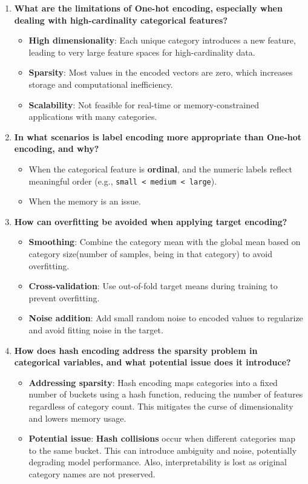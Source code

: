 \documentclass[a4paper,12pt]{article}
\begin{document}
\begin{enumerate}[label=(\alph*)]
\item \textbf{What are the limitations of One-hot encoding, especially when dealing with high-cardinality categorical features?}

\begin{itemize}
    \item \textbf{High dimensionality}: Each unique category introduces a new feature, leading to very large feature spaces for high-cardinality data.
    \item \textbf{Sparsity}: Most values in the encoded vectors are zero, which increases storage and computational inefficiency.
    \item \textbf{Scalability}: Not feasible for real-time or memory-constrained applications with many categories.
\end{itemize}

\item \textbf{In what scenarios is label encoding more appropriate than One-hot encoding, and why?}

\begin{itemize}
    \item When the categorical feature is \textbf{ordinal}, and the numeric labels reflect meaningful order (e.g., \texttt{small < medium < large}).
    \item When the memory is an issue.
\end{itemize}

\item \textbf{How can overfitting be avoided when applying target encoding?}

\begin{itemize}
    \item \textbf{Smoothing}: Combine the category mean with the global mean based on category size(number of samples, being in that category) to avoid overfitting.
    \item \textbf{Cross-validation}: Use out-of-fold target means during training to prevent overfitting.
    \item \textbf{Noise addition}: Add small random noise to encoded values to regularize and avoid fitting noise in the target.
\end{itemize}

\item \textbf{How does hash encoding address the sparsity problem in categorical variables, and what potential issue does it introduce?}

\begin{itemize}
    \item \textbf{Addressing sparsity}: Hash encoding maps categories into a fixed number of buckets using a hash function, reducing the number of features regardless of category count. This mitigates the curse of dimensionality and lowers memory usage.
    \item \textbf{Potential issue}: \textbf{Hash collisions} occur when different categories map to the same bucket. This can introduce ambiguity and noise, potentially degrading model performance. Also, interpretability is lost as original category names are not preserved.
\end{itemize}
\end{enumerate}
\end{document}
